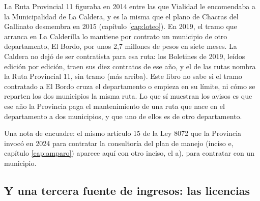 \begin{cautela}
La Ruta Provincial 11 figuraba en 2014 entre las que Vialidad le encomendaba a la Municipalidad de La Caldera, y es la misma que el plano de Chacras del Gallinato desmembra en 2015 (capítulo \ref{cap:loteo}). En 2019, el tramo que arranca en La Calderilla lo mantiene por contrato un municipio de otro departamento, El Bordo, por unos 2,7 millones de pesos en siete meses. La Caldera no dejó de ser contratista para esa ruta: los Boletines de 2019, leídos edición por edición, traen sus diez contratos de ese año, y el de las rutas nombra la Ruta Provincial 11, sin tramo (más arriba). Este libro no sabe si el tramo contratado a El Bordo cruza el departamento o empieza en su límite, ni cómo se reparten los dos municipios la misma ruta. Lo que sí muestran los avisos es que ese año la Provincia paga el mantenimiento de una ruta que nace en el departamento a dos municipios, y que uno de ellos es de otro departamento.

Una nota de encuadre: el mismo artículo 15 de la Ley 8072 que la Provincia invocó en 2024 para contratar la consultoría del plan de manejo (inciso e, capítulo \ref{cap:amparo}) aparece aquí con otro inciso, el a), para contratar con un municipio. 
\end{cautela}

\subsection*{Y una tercera fuente de ingresos: las licencias}

